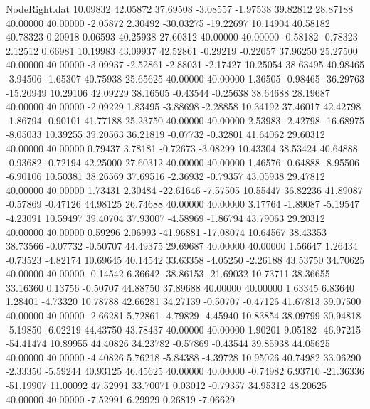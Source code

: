 \begin{filecontents}{NodeRight.dat}
  10.09832   42.05872   37.69508    -3.08557   -1.97538   39.82812   28.87188   40.00000   40.00000   -2.05872    2.30492  -30.03275  -19.22697
  10.14904   40.58182   40.78323     0.20918    0.06593   40.25938   27.60312   40.00000   40.00000   -0.58182   -0.78323    2.12512    0.66981
  10.19983   43.09937   42.52861    -0.29219   -0.22057   37.96250   25.27500   40.00000   40.00000   -3.09937   -2.52861   -2.88031   -2.17427
  10.25054   38.63495   40.98465    -3.94506   -1.65307   40.75938   25.65625   40.00000   40.00000    1.36505   -0.98465  -36.29763  -15.20949
  10.29106   42.09229   38.16505    -0.43544   -0.25638   38.64688   28.19687   40.00000   40.00000   -2.09229    1.83495   -3.88698   -2.28858
  10.34192   37.46017   42.42798    -1.86794   -0.90101   41.77188   25.23750   40.00000   40.00000    2.53983   -2.42798  -16.68975   -8.05033
  10.39255   39.20563   36.21819    -0.07732   -0.32801   41.64062   29.60312   40.00000   40.00000    0.79437    3.78181   -0.72673   -3.08299
  10.43304   38.53424   40.64888    -0.93682   -0.72194   42.25000   27.60312   40.00000   40.00000    1.46576   -0.64888   -8.95506   -6.90106
  10.50381   38.26569   37.69516    -2.36932   -0.79357   43.05938   29.47812   40.00000   40.00000    1.73431    2.30484  -22.61646   -7.57505
  10.55447   36.82236   41.89087    -0.57869   -0.47126   44.98125   26.74688   40.00000   40.00000    3.17764   -1.89087   -5.19547   -4.23091
  10.59497   39.40704   37.93007    -4.58969   -1.86794   43.79063   29.20312   40.00000   40.00000    0.59296    2.06993  -41.96881  -17.08074
  10.64567   38.43353   38.73566    -0.07732   -0.50707   44.49375   29.69687   40.00000   40.00000    1.56647    1.26434   -0.73523   -4.82174
  10.69645   40.14542   33.63358    -4.05250   -2.26188   43.53750   34.70625   40.00000   40.00000   -0.14542    6.36642  -38.86153  -21.69032
  10.73711   38.36655   33.16360     0.13756   -0.50707   44.88750   37.89688   40.00000   40.00000    1.63345    6.83640    1.28401   -4.73320
  10.78788   42.66281   34.27139    -0.50707   -0.47126   41.67813   39.07500   40.00000   40.00000   -2.66281    5.72861   -4.79829   -4.45940
  10.83854   38.09799   30.94818    -5.19850   -6.02219   44.43750   43.78437   40.00000   40.00000    1.90201    9.05182  -46.97215  -54.41474
  10.89955   44.40826   34.23782    -0.57869   -0.43544   39.85938   44.05625   40.00000   40.00000   -4.40826    5.76218   -5.84388   -4.39728
  10.95026   40.74982   33.06290    -2.33350   -5.59244   40.93125   46.45625   40.00000   40.00000   -0.74982    6.93710  -21.36336  -51.19907
  11.00092   47.52991   33.70071     0.03012   -0.79357   34.95312   48.20625   40.00000   40.00000   -7.52991    6.29929    0.26819   -7.06629

\end{filecontents}
